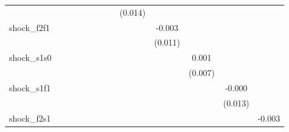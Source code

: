 {\begin{tabular}{l*{12}{c}}
            &                     &                     &                     &                     &                     &                     &                     &     (0.014)         &                     &                     &                     &                     \\
\addlinespace
shock\_f2f1  &                     &                     &                     &                     &                     &                     &                     &                     &      -0.003         &                     &                     &                     \\
            &                     &                     &                     &                     &                     &                     &                     &                     &     (0.011)         &                     &                     &                     \\
\addlinespace
shock\_s1s0  &                     &                     &                     &                     &                     &                     &                     &                     &                     &       0.001         &                     &                     \\
            &                     &                     &                     &                     &                     &                     &                     &                     &                     &     (0.007)         &                     &                     \\
\addlinespace
shock\_s1f1  &                     &                     &                     &                     &                     &                     &                     &                     &                     &                     &      -0.000         &                     \\
            &                     &                     &                     &                     &                     &                     &                     &                     &                     &                     &     (0.013)         &                     \\
\addlinespace
shock\_f2s1  &                     &                     &                     &                     &                     &                     &                     &                     &                     &                     &                     &      -0.003         \\

\end{tabular}}
